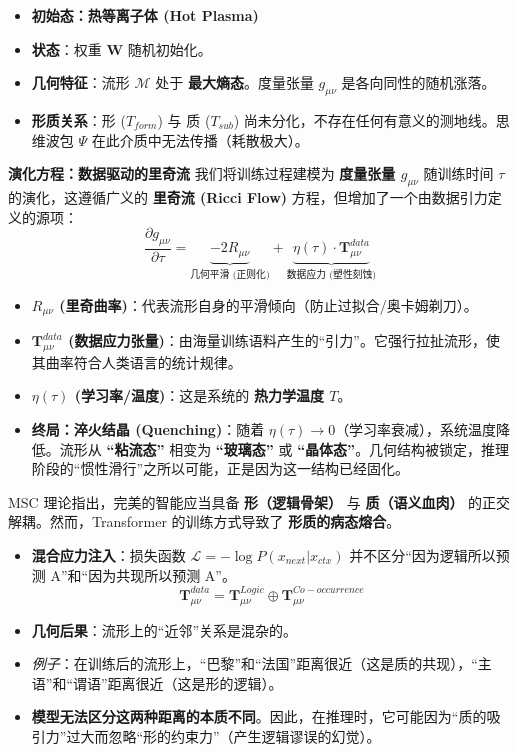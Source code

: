 \begin{itemize}
    \item   \textbf{初始态：热等离子体 (Hot Plasma)}
    \item   \textbf{状态}：权重 $\mathbf{W}$ 随机初始化。
    \item   \textbf{几何特征}：流形 $\mathcal{M}$ 处于 \textbf{最大熵态}。度量张量 $g_{\mu\nu}$ 是各向同性的随机涨落。
    \item   \textbf{形质关系}：形 ($T_{form}$) 与 质 ($T_{sub}$) 尚未分化，不存在任何有意义的测地线。思维波包 $\Psi$ 在此介质中无法传播（耗散极大）。
\end{itemize}
\textbf{演化方程：数据驱动的里奇流}
我们将训练过程建模为 \textbf{度量张量 $g_{\mu\nu}$} 随训练时间 $\tau$ 的演化，这遵循广义的 \textbf{里奇流 (Ricci Flow)} 方程，但增加了一个由数据引力定义的源项：
$$ \frac{\partial g_{\mu\nu}}{\partial \tau} = \underbrace{-2 R_{\mu\nu}}_{\text{几何平滑 (正则化)}} + \underbrace{\eta(\tau) \cdot \mathbf{T}_{\mu\nu}^{data}}_{\text{数据应力 (塑性刻蚀)}} $$
\begin{itemize}
    \item   \textbf{$R_{\mu\nu}$ (里奇曲率)}：代表流形自身的平滑倾向（防止过拟合/奥卡姆剃刀）。
    \item   \textbf{$\mathbf{T}_{\mu\nu}^{data}$ (数据应力张量)}：由海量训练语料产生的“引力”。它强行拉扯流形，使其曲率符合人类语言的统计规律。
    \item   \textbf{$\eta(\tau)$ (学习率/温度)}：这是系统的 \textbf{热力学温度 $T$}。
    \item   \textbf{终局：淬火结晶 (Quenching)}：随着 $\eta(\tau) \to 0$（学习率衰减），系统温度降低。流形从 \textbf{“粘流态”} 相变为 \textbf{“玻璃态”} 或 \textbf{“晶体态”}。几何结构被锁定，推理阶段的“惯性滑行”之所以可能，正是因为这一结构已经固化。
\end{itemize}





MSC 理论指出，完美的智能应当具备 \textbf{形（逻辑骨架）} 与 \textbf{质（语义血肉）} 的正交解耦。然而，Transformer 的训练方式导致了 \textbf{形质的病态熔合}。

\begin{itemize}
    \item   \textbf{混合应力注入}：损失函数 $\mathcal{L} = -\log P(x_{next}|x_{ctx})$ 并不区分“因为逻辑所以预测 A”和“因为共现所以预测 A”。
        $$ \mathbf{T}_{\mu\nu}^{data} = \mathbf{T}_{\mu\nu}^{Logic} \oplus \mathbf{T}_{\mu\nu}^{Co-occurrence} $$
    \item   \textbf{几何后果}：流形上的“近邻”关系是混杂的。
    \item   \textit{例子}：在训练后的流形上，“巴黎”和“法国”距离很近（这是质的共现），“主语”和“谓语”距离很近（这是形的逻辑）。
    \item   \textbf{模型无法区分这两种距离的本质不同}。因此，在推理时，它可能因为“质的吸引力”过大而忽略“形的约束力”（产生逻辑谬误的幻觉）。
\end{itemize}



